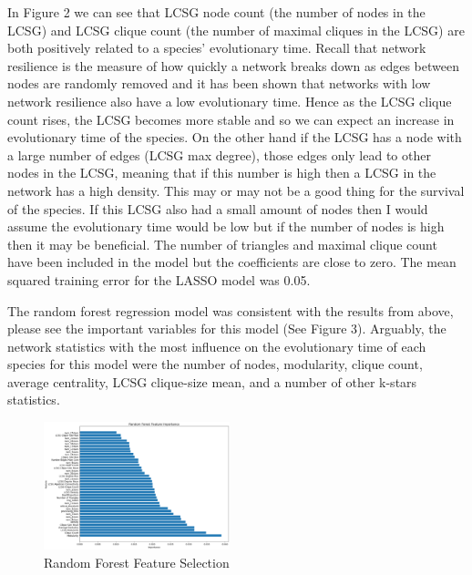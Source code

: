 \documentclass[12pt]{article}
\begin{document}
\indent In Figure 2 we can see that LCSG node count (the number of nodes in the LCSG) and LCSG clique count (the number of maximal cliques in the LCSG) are both positively related to a species' evolutionary time.  Recall that network resilience is the measure of how quickly a network breaks down as edges between nodes are randomly removed and it has been shown that networks with low network resilience also have a low evolutionary time. Hence as the LCSG clique count rises, the LCSG becomes more stable and so we can expect an increase in evolutionary time of the species. On the other hand if the LCSG has a node with a large number of edges (LCSG max degree), those edges only lead to other nodes in the LCSG, meaning that if this number is high then a LCSG in the network has a high density. This may or may not be a good thing for the survival of the species. If this LCSG also had a small amount of nodes then I would assume the evolutionary time would be low but if the number of nodes is high then it may be beneficial. The number of triangles and maximal clique count have been included in the model but the coefficients are close to zero. The mean squared training error for the LASSO model was 0.05. 

The random forest regression model was consistent with the results from above, please see the important variables for this model (See Figure 3). Arguably, the network statistics with the most influence on the evolutionary time of each species for this model were the number of nodes, modularity, clique count, average centrality, LCSG clique-size mean, and a number of other k-stars statistics. 
\begin{figure}
  \vspace{-20pt}
  \begin{center}
    \includegraphics[width=0.48\textwidth]{PPIN_fig2}
  \end{center}
  \vspace{-20pt}
  \caption{Random Forest Feature Selection}
  \vspace{-10pt}
\end{figure}
\end{document}

